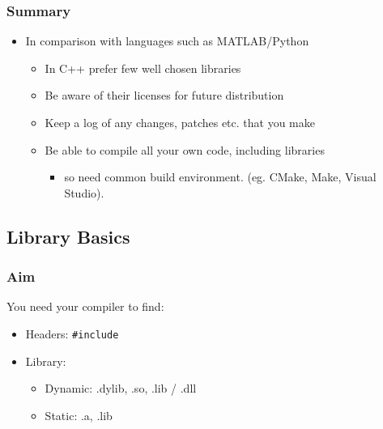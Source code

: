 \subsubsection{Summary}\label{summary}

\begin{itemize}
\itemsep1pt\parskip0pt
\item
  In comparison with languages such as MATLAB/Python

  \begin{itemize}
  \itemsep1pt\parskip0pt
  \item
    In C++ prefer few well chosen libraries
  \item
    Be aware of their licenses for future distribution
  \item
    Keep a log of any changes, patches etc. that you make
  \item
    Be able to compile all your own code, including libraries

    \begin{itemize}
    \itemsep1pt\parskip0pt
    \item
      so need common build environment. (eg. CMake, Make, Visual
      Studio).
    \end{itemize}
  \end{itemize}
\end{itemize}

\subsection{Library Basics}\label{library-basics}

\subsubsection{Aim}\label{aim}

You need your compiler to find:

\begin{itemize}
\itemsep1pt\parskip0pt
\item
  Headers: \texttt{\#include}
\item
  Library:

  \begin{itemize}
  \itemsep1pt\parskip0pt
  \item
    Dynamic: .dylib, .so, .lib / .dll
  \item
    Static: .a, .lib
  \end{itemize}
\end{itemize}

